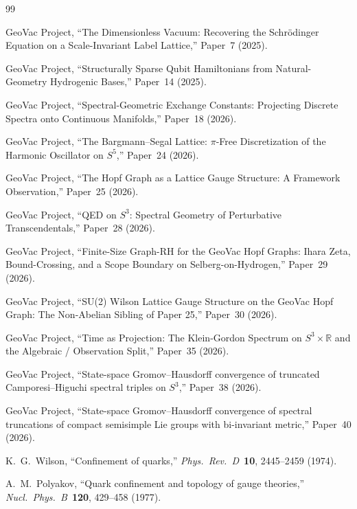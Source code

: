 \documentclass[11pt]{article}
\begin{document}
\begin{thebibliography}{99}

GeoVac Project, ``The Dimensionless Vacuum: Recovering the Schr\"odinger
Equation on a Scale-Invariant Label Lattice,'' Paper~7 (2025).

GeoVac Project, ``Structurally Sparse Qubit Hamiltonians from Natural-Geometry
Hydrogenic Bases,'' Paper~14 (2025).

GeoVac Project, ``Spectral-Geometric Exchange Constants: Projecting
Discrete Spectra onto Continuous Manifolds,'' Paper~18 (2026).

GeoVac Project, ``The Bargmann--Segal Lattice: $\pi$-Free Discretization of
the Harmonic Oscillator on $S^5$,'' Paper~24 (2026).

GeoVac Project, ``The Hopf Graph as a Lattice Gauge Structure: A
Framework Observation,'' Paper~25 (2026).

GeoVac Project, ``QED on $S^3$: Spectral Geometry of Perturbative
Transcendentals,'' Paper~28 (2026).

GeoVac Project, ``Finite-Size Graph-RH for the GeoVac Hopf Graphs: Ihara Zeta, Bound-Crossing, and a Scope Boundary on Selberg-on-Hydrogen,'' Paper~29
(2026).

GeoVac Project, ``SU(2) Wilson Lattice Gauge Structure on the GeoVac Hopf
Graph: The Non-Abelian Sibling of Paper 25,'' Paper~30 (2026).

GeoVac Project, ``Time as Projection: The Klein-Gordon Spectrum on
$S^3 \times \mathbb{R}$ and the Algebraic / Observation Split,''
Paper~35 (2026).

GeoVac Project, ``State-space Gromov--Hausdorff convergence of truncated
Camporesi--Higuchi spectral triples on $S^3$,'' Paper~38 (2026).

GeoVac Project, ``State-space Gromov--Hausdorff convergence of spectral
truncations of compact semisimple Lie groups with bi-invariant metric,''
Paper~40 (2026).

K.~G.~Wilson, ``Confinement of quarks,''
\textit{Phys.~Rev.~D}~\textbf{10}, 2445--2459 (1974).

A.~M.~Polyakov, ``Quark confinement and topology of gauge theories,''
\textit{Nucl.~Phys.~B}~\textbf{120}, 429--458 (1977).


\end{thebibliography}
\end{document}

